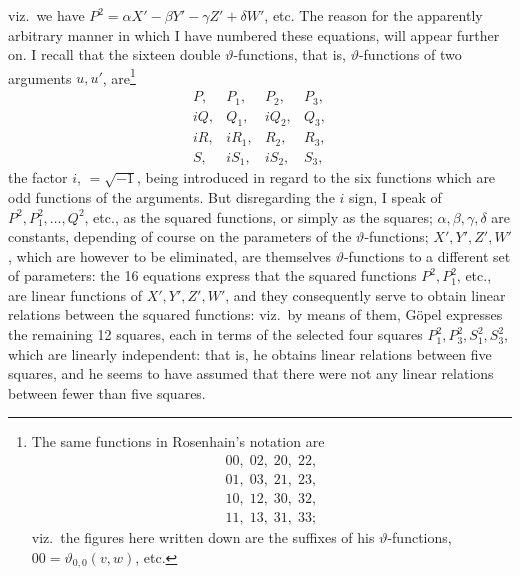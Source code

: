 \documentclass[11pt,a4paper]{article}
\begin{document}
\noindent viz.\ we have $P^{2} = \alpha X' - \beta Y' - \gamma Z' + \delta W'$, etc. The reason for the apparently arbitrary manner in which I have numbered these equations, will appear further on. I recall that the sixteen double $\vartheta$-functions, that is, $\vartheta$-functions of two arguments $u, u'$, are\footnote{The same functions in Rosenhain's notation are
\[
\begin{array}{l}
00,\;02,\;20,\;22,\\
01,\;03,\;21,\;23,\\
10,\;12,\;30,\;32,\\
11,\;13,\;31,\;33;
\end{array}
\]
viz.\ the figures here written down are the suffixes of his $\vartheta$-functions, $00 = \vartheta_{0,0}(v, w)$, etc.}
\[
\begin{array}{cccc}
P, & P_{1}, & P_{2}, & P_{3},\\
iQ, & Q_{1}, & iQ_{2}, & Q_{3},\\
iR, & iR_{1}, & R_{2}, & R_{3},\\
S, & iS_{1}, & iS_{2}, & S_{3},
\end{array}
\]
the factor $i$, $= \sqrt{-1}$, being introduced in regard to the six functions which are odd functions of the arguments. But disregarding the $i$ sign, I speak of $P^{2}, P_{1}^{2}, \ldots, Q^{2}$, etc., as the squared functions, or simply as the squares; $\alpha, \beta, \gamma, \delta$ are constants, depending of course on the parameters of the $\vartheta$-functions; $X', Y', Z', W'$, which are however to be eliminated, are themselves $\vartheta$-functions to a different set of parameters: the 16 equations express that the squared functions $P^{2}, P_{1}^{2}$, etc., are linear functions of $X', Y', Z', W'$, and they consequently serve to obtain linear relations between the squared functions: viz.\ by means of them, G\"opel expresses the remaining 12 squares, each in terms of the selected four squares $P_{1}^{2}, P_{3}^{2}, S_{1}^{2}, S_{3}^{2}$, which are linearly independent: that is, he obtains linear relations between five squares, and he seems to have assumed that there were not any linear relations between fewer than five squares.

\medskip
\end{document}
